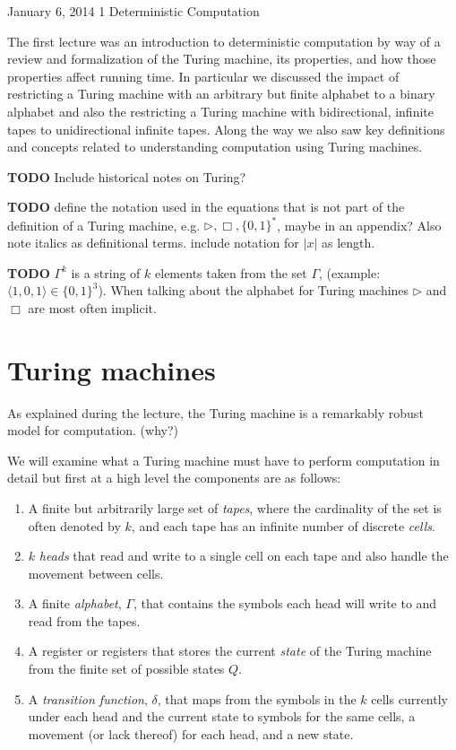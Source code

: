 \documentclass[usletter]{article}
\begin{document}
           {January 6, 2014}           %
           {1}                         %
           {Deterministic Computation} %

\noindent

The first lecture was an introduction to deterministic computation by way of a review and formalization of the Turing machine, its properties, and how those properties affect running time. In particular we discussed the impact of restricting a Turing machine with an arbitrary but finite alphabet to a binary alphabet and also the restricting a Turing machine with bidirectional, infinite tapes to unidirectional infinite tapes. Along the way we also saw key definitions and concepts related to understanding computation using Turing machines.

\textbf{TODO} Include historical notes on Turing?

\textbf{TODO} define the notation used in the equations that is not part of the definition of a Turing machine, e.g. $\rhd, \Box, \{0,1\}^*$, maybe in an appendix? Also note italics as definitional terms. include notation for $|x|$ as length.

\textbf{TODO} $\Gamma^{k}$ is a string of $k$ elements taken from the set $\Gamma$, (example: $\langle 1,0,1 \rangle \in \{0,1\}^3$). When talking about the alphabet for Turing machines $\rhd$ and $\Box$ are most often implicit.



\section{Turing machines}

As explained during the lecture, the Turing machine is a remarkably robust model for computation. (why?)

We will examine what a Turing machine must have to perform computation in detail but first at a high level the components are as follows:

\begin{enumerate}
  \item A finite but arbitrarily large set of \textit{tapes},  where the cardinality of the set is often denoted by $k$, and each tape has an infinite number of discrete \textit{cells}.
  \item $k$ \textit{heads} that read and write to a single cell on each tape and also handle the movement between cells.
  \item A finite \textit{alphabet}, $\Gamma$, that contains the symbols each head will write to and read from the tapes.
  \item A register or registers that stores the current \textit{state} of the Turing machine from the finite set of possible states $Q$.
  \item A \textit{transition function}, $\delta$, that maps from the symbols in the $k$ cells currently under each head and the current state to symbols for the same cells, a movement (or lack thereof) for each head, and a new state.
\end{enumerate}
\end{document}
